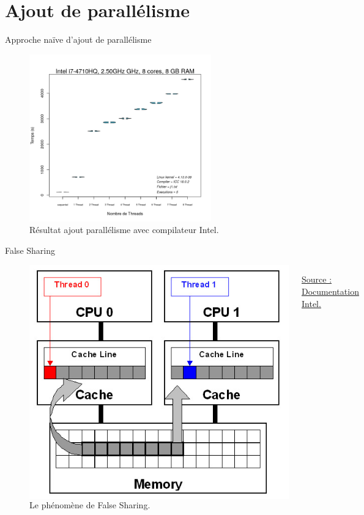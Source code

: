 \documentclass{beamer}
\begin{document}
\section{Ajout de parallélisme}

\begin{frame}{Approche naïve d'ajout de parallélisme}
	\begin{figure}
      \includegraphics[width=0.7\textwidth]{intel_parallel_naif.png}
      \caption{Résultat ajout parallélisme avec compilateur Intel.\label{Fig:naif_intel}}
  
	\end{figure}
\end{frame}

\begin{frame}{False Sharing}
	\begin{figure}
	\begin{columns}
      \includegraphics[width=\textwidth]{false_sharing.jpg}
      \caption{Le phénomène de False Sharing.\label{Fig:false_sharing}}{\href{https://software.intel.com/en-us/articles/avoiding-and-identifying-false-sharing-among-threads}{Source : Documentation Intel.}}
    \end{columns}	
    \end{figure}
\end{frame}
\end{document}
